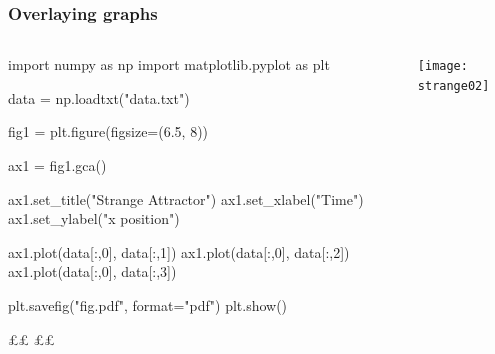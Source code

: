 \documentclass[handout, notes=hide]{beamer}
\begin{document}
\begin{frame}[fragile]
\frametitle{Overlaying graphs}
\setlength{\parskip}{0.5em}

\begin{columns}[T]
\begin{column}[T]{0.5\textwidth}
\setlength{\parskip}{0.7em}

\begin{python}
import numpy as np
import matplotlib.pyplot as plt


data = np.loadtxt("data.txt")

fig1 = plt.figure(figsize=(6.5, 8))

ax1 = fig1.gca()

ax1.set_title("Strange Attractor")
ax1.set_xlabel("Time")
ax1.set_ylabel("x position")


ax1.plot(data[:,0], data[:,1])
ax1.plot(data[:,0], data[:,2])
ax1.plot(data[:,0], data[:,3])

plt.savefig("fig.pdf", format="pdf")
plt.show()






££  ££
\end{python}

\end{column}
\begin{column}[T]{0.5\textwidth}

\texttt{[image: strange02]}
\end{column}
\end{columns}


\end{frame}
\note{
\setlength{\parskip}{0.5em}
}
 
\end{document}
